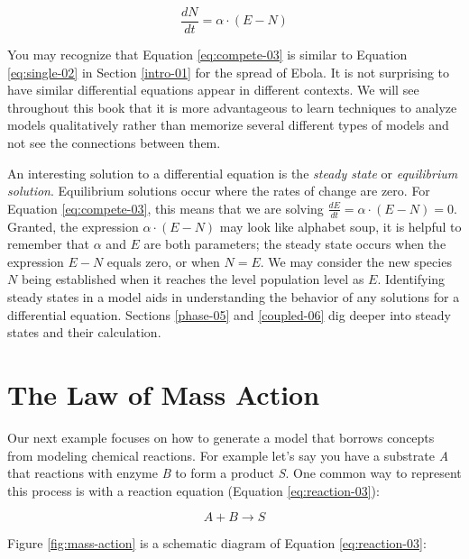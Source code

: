 \documentclass[
]{krantz}
\theoremstyle{definition}
\theoremstyle{definition}
\theoremstyle{definition}
\theoremstyle{definition}
\theoremstyle{remark}
\begin{document}
\begin{equation}
\frac{dN}{dt} = \alpha \cdot (E-N) \label{eq:compete-03}
\end{equation}

You may recognize that Equation \eqref{eq:compete-03} is similar to Equation \eqref{eq:single-02} in Section \ref{intro-01} for the spread of Ebola. It is not surprising to have similar differential equations appear in different contexts. We will see throughout this book that it is more advantageous to learn techniques to analyze models qualitatively rather than memorize several different types of models and not see the connections between them.

An interesting solution to a differential equation is the \emph{steady state} or \emph{equilibrium solution}. Equilibrium solutions occur where the rates of change are zero. For Equation \eqref{eq:compete-03}, this means that we are solving \(\displaystyle \frac{dE}{dt} = \alpha \cdot (E-N) = 0\). Granted, the expression \(\alpha \cdot (E-N)\) may look like alphabet soup, it is helpful to remember that \(\alpha\) and \(E\) are both parameters; the steady state occurs when the expression \(E-N\) equals zero, or when \(N = E\). We may consider the new species \(N\) being established when it reaches the level population level as \(E\). Identifying steady states in a model aids in understanding the behavior of any solutions for a differential equation. Sections \ref{phase-05} and \ref{coupled-06} dig deeper into steady states and their calculation.

\hypertarget{the-law-of-mass-action}{%
\section{The Law of Mass Action}\label{the-law-of-mass-action}}

Our next example focuses on how to generate a model that borrows concepts from modeling chemical reactions. For example let's say you have a substrate \emph{A} that reactions with enzyme \emph{B} to form a product \emph{S}. One common way to represent this process is with a reaction equation (Equation \eqref{eq:reaction-03}):

\begin{equation}
A+B \rightarrow S  \label{eq:reaction-03}
\end{equation}

Figure \ref{fig:mass-action} is a schematic diagram of Equation \eqref{eq:reaction-03}:
\end{document}
